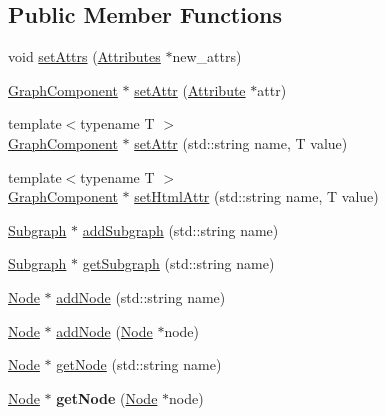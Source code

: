 \subsection*{Public Member Functions}
\begin{DoxyCompactItemize}
\item 
void \hyperlink{classmemgraph_1_1_graph_component_a2813369e47c5eea04c0bf8465e9d9001}{set\+Attrs} (\hyperlink{classmemgraph_1_1_attributes}{Attributes} $\ast$new\+\_\+attrs)
\item 
\hyperlink{classmemgraph_1_1_graph_component}{Graph\+Component} $\ast$ \hyperlink{classmemgraph_1_1_graph_component_a774254d491820b37650b94b37a09023e}{set\+Attr} (\hyperlink{classmemgraph_1_1_attribute}{Attribute} $\ast$attr)
\item 
{\footnotesize template$<$typename T $>$ }\\\hyperlink{classmemgraph_1_1_graph_component}{Graph\+Component} $\ast$ \hyperlink{classmemgraph_1_1_graph_component_ac13236d4ce3e206dc27c5dbba785d290}{set\+Attr} (std\+::string name, T value)
\item 
{\footnotesize template$<$typename T $>$ }\\\hyperlink{classmemgraph_1_1_graph_component}{Graph\+Component} $\ast$ \hyperlink{classmemgraph_1_1_graph_component_aada5cbecdcb6566b1d849a30794aa4dc}{set\+Html\+Attr} (std\+::string name, T value)
\item 
\hyperlink{classmemgraph_1_1_subgraph}{Subgraph} $\ast$ \hyperlink{classmemgraph_1_1_graph_component_afeb59f4ee7352edf2c15002033a21ce0}{add\+Subgraph} (std\+::string name)
\item 
\hyperlink{classmemgraph_1_1_subgraph}{Subgraph} $\ast$ \hyperlink{classmemgraph_1_1_graph_component_a45d5456bc27935a01d2ef9a2a35d6026}{get\+Subgraph} (std\+::string name)
\item 
\hyperlink{classmemgraph_1_1_node}{Node} $\ast$ \hyperlink{classmemgraph_1_1_graph_component_a874fd01ba3609a7c19fd8616a37ba255}{add\+Node} (std\+::string name)
\item 
\hyperlink{classmemgraph_1_1_node}{Node} $\ast$ \hyperlink{classmemgraph_1_1_graph_component_a92bec3883a6a97604110dd708847fd00}{add\+Node} (\hyperlink{classmemgraph_1_1_node}{Node} $\ast$node)
\item 
\hyperlink{classmemgraph_1_1_node}{Node} $\ast$ \hyperlink{classmemgraph_1_1_graph_component_ab4b8791494f838246a5f406437c132b9}{get\+Node} (std\+::string name)
\item 
\hyperlink{classmemgraph_1_1_node}{Node} $\ast$ {\bfseries get\+Node} (\hyperlink{classmemgraph_1_1_node}{Node} $\ast$node)\hypertarget{classmemgraph_1_1_graph_component_adc89c88632a9410abba46bf5ac48e975}{}\label{classmemgraph_1_1_graph_component_adc89c88632a9410abba46bf5ac48e975}


\end{DoxyCompactItemize}
